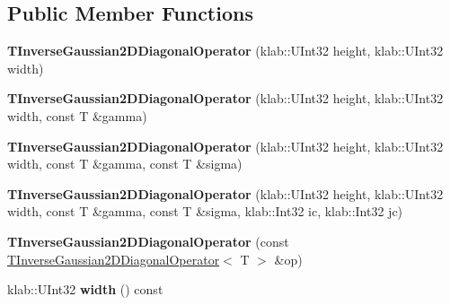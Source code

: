 \subsection*{Public Member Functions}
\begin{DoxyCompactItemize}
\item 
{\bfseries T\+Inverse\+Gaussian2\+D\+Diagonal\+Operator} (klab\+::\+U\+Int32 height, klab\+::\+U\+Int32 width)\hypertarget{classkl1p_1_1TInverseGaussian2DDiagonalOperator_ad5281d2c861d9613800a0fcfd49fa7ca}{}\label{classkl1p_1_1TInverseGaussian2DDiagonalOperator_ad5281d2c861d9613800a0fcfd49fa7ca}

\item 
{\bfseries T\+Inverse\+Gaussian2\+D\+Diagonal\+Operator} (klab\+::\+U\+Int32 height, klab\+::\+U\+Int32 width, const T \&gamma)\hypertarget{classkl1p_1_1TInverseGaussian2DDiagonalOperator_a0c9eb6d9de01585397f0015750921d00}{}\label{classkl1p_1_1TInverseGaussian2DDiagonalOperator_a0c9eb6d9de01585397f0015750921d00}

\item 
{\bfseries T\+Inverse\+Gaussian2\+D\+Diagonal\+Operator} (klab\+::\+U\+Int32 height, klab\+::\+U\+Int32 width, const T \&gamma, const T \&sigma)\hypertarget{classkl1p_1_1TInverseGaussian2DDiagonalOperator_a717270cb5bfabd1f42d3980be693e788}{}\label{classkl1p_1_1TInverseGaussian2DDiagonalOperator_a717270cb5bfabd1f42d3980be693e788}

\item 
{\bfseries T\+Inverse\+Gaussian2\+D\+Diagonal\+Operator} (klab\+::\+U\+Int32 height, klab\+::\+U\+Int32 width, const T \&gamma, const T \&sigma, klab\+::\+Int32 ic, klab\+::\+Int32 jc)\hypertarget{classkl1p_1_1TInverseGaussian2DDiagonalOperator_a12269fb1a72d21be10c94fb43853c2df}{}\label{classkl1p_1_1TInverseGaussian2DDiagonalOperator_a12269fb1a72d21be10c94fb43853c2df}

\item 
{\bfseries T\+Inverse\+Gaussian2\+D\+Diagonal\+Operator} (const \hyperlink{classkl1p_1_1TInverseGaussian2DDiagonalOperator}{T\+Inverse\+Gaussian2\+D\+Diagonal\+Operator}$<$ T $>$ \&op)\hypertarget{classkl1p_1_1TInverseGaussian2DDiagonalOperator_a2d005d7d6dab044caa2b873ab6677314}{}\label{classkl1p_1_1TInverseGaussian2DDiagonalOperator_a2d005d7d6dab044caa2b873ab6677314}

\item 
klab\+::\+U\+Int32 {\bfseries width} () const \hypertarget{classkl1p_1_1TInverseGaussian2DDiagonalOperator_a0c851673222470fa2d46a47a09601ee1}{}\label{classkl1p_1_1TInverseGaussian2DDiagonalOperator_a0c851673222470fa2d46a47a09601ee1}


\end{DoxyCompactItemize}
